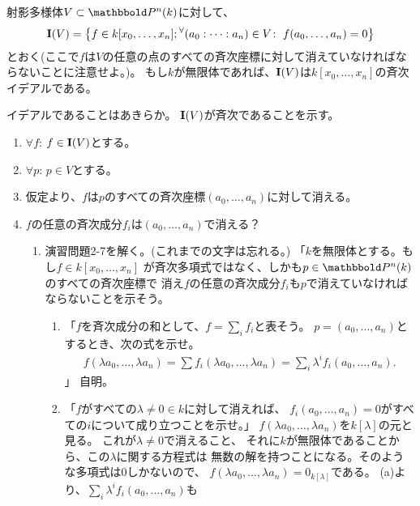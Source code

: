 \begin{framed}
  射影多様体$V\subset \P^n(k)$に対して、
  \begin{align}
    \textbf I(V) = \left\{f\in k[x_0,\dots,x_n];
    {}^{\forall}{(a_0:\dots:a_n)\in V}\mathrm{\colon\;} f(a_0,\dots,a_n) = 0\right\}
  \end{align}
  とおく(ここで$f$は$V$の任意の点のすべての斉次座標に対して消えていなければならないことに注意せよ。)。
  もし$k$が無限体であれば、$\textbf I(V)$は$k[x_0,\dots,x_n]$の斉次イデアルである。
\end{framed}
\begin{myproof}
  イデアルであることはあきらか。
  $\textbf I(V)$が斉次であることを示す。
  \begin{enumerate}
    \item $\forall f$: $f\in \textbf I(V)$とする。
    \item $\forall p$: $p\in V$とする。
    \item 仮定より、$f$は$p$のすべての斉次座標$(a_0,\dots,a_n)$に対して消える。
    \item $f$の任意の斉次成分$f_i$は$(a_0,\dots,a_n)$で消える？
    \begin{enumerate}
      \item     演習問題2-7を解く。(これまでの文字は忘れる。)
      「$k$を無限体とする。もし$f\in k[x_0,\dots,x_n]$
      が斉次多項式ではなく、しかも$p\in \P^n(k)$のすべての斉次座標で
      消え$f$の任意の斉次成分$f_i$も$p$で消えていなければならないことを示そう。
      \begin{enumerate}[label=(演習2-7-\alph*)]
        \item
        「$f$を斉次成分の和として、$f=\sum_i f_i$と表そう。
        $p=(a_0,\dots,a_n)$とするとき、次の式を示せ。
        \begin{align}
          f(\lambda a_0,\dots,\lambda a_n)
          =
          \sum f_i(\lambda a_0, \dots, \lambda a_n)
          =
          \sum_i \lambda^if_i(a_0,\dots,a_n).
        \end{align}
        」
        自明。
        \item
        「$f$がすべての$\lambda\neq 0\in k$に対して消えれば、
        $f_i(a_0,\dots,a_n)=0$がすべての$i$について成り立つことを示せ。」
        $f(\lambda a_0,\dots,\lambda a_n)$を$k[\lambda]$の元と見る。
        これが$\lambda\neq 0$で消えること、
        それに$k$が無限体であることから、この$\lambda$に関する方程式は
        無数の解を持つことになる。そのような多項式は0しかないので、
        $f(\lambda a_0,\dots,\lambda a_n) = 0_{k[\lambda]}$である。
        (a)より、$\sum_i \lambda^i f_i(a_0,\dots,a_n)$も

\end{enumerate}
\end{enumerate}
\end{enumerate}
\end{myproof}
